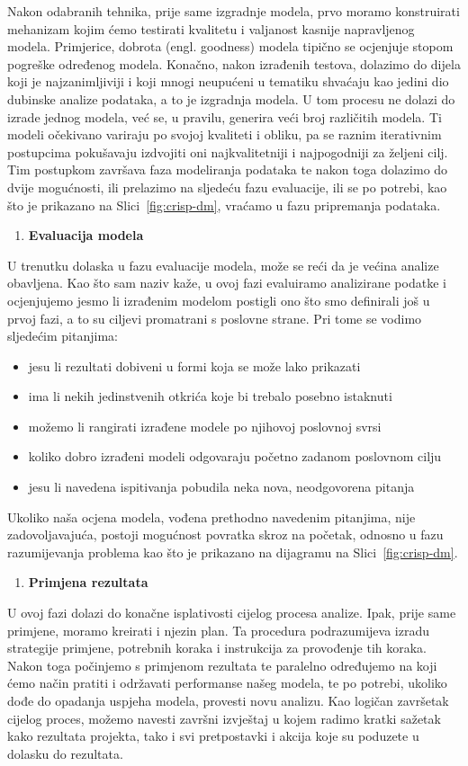 \documentclass[times, utf8, zavrsni, numeric]{fer}
\begin{document}
Nakon odabranih tehnika, prije same izgradnje modela, prvo moramo konstruirati mehanizam kojim ćemo testirati kvalitetu i valjanost kasnije napravljenog modela. Primjerice, dobrota (engl. goodness) modela tipično se ocjenjuje stopom pogreške određenog modela. Konačno, nakon izrađenih testova, dolazimo do dijela koji je najzanimljiviji i koji mnogi neupućeni u tematiku shvaćaju kao jedini dio dubinske analize podataka, a to je izgradnja modela. U tom procesu ne dolazi do izrade jednog modela, već se, u pravilu, generira veći broj različitih modela. Ti modeli očekivano variraju po svojoj kvaliteti i obliku, pa se raznim iterativnim postupcima pokušavaju izdvojiti oni najkvalitetniji i najpogodniji za željeni cilj. Tim postupkom završava faza modeliranja podataka te nakon toga dolazimo do dvije mogućnosti, ili prelazimo na sljedeću fazu evaluacije, ili se po potrebi, kao što je prikazano na Slici~\ref{fig:crisp-dm}, vraćamo u fazu pripremanja podataka.\cite{crisp2}\cite{crisp3}
\begin{enumerate}[resume]
\item \textbf{Evaluacija modela}
\end{enumerate}
U trenutku dolaska u fazu evaluacije modela, može se reći da je većina analize obavljena. Kao što sam naziv kaže, u ovoj fazi evaluiramo analizirane podatke i ocjenjujemo jesmo li izrađenim modelom postigli ono što smo definirali još u prvoj fazi, a to su ciljevi promatrani s poslovne strane. Pri tome se vodimo sljedećim pitanjima:
\begin{itemize}
\item jesu li rezultati dobiveni u formi koja se može lako prikazati
\item ima li nekih jedinstvenih otkrića koje bi trebalo posebno istaknuti
\item možemo li rangirati izrađene modele po njihovoj poslovnoj svrsi
\item koliko dobro izrađeni modeli odgovaraju početno zadanom poslovnom cilju
\item jesu li navedena ispitivanja pobudila neka nova, neodgovorena pitanja
\end{itemize}
Ukoliko naša ocjena modela, vođena prethodno navedenim pitanjima, nije zadovoljavajuća, postoji mogućnost povratka skroz na početak, odnosno u fazu razumijevanja problema kao što je prikazano na dijagramu na Slici~\ref{fig:crisp-dm}.\cite{crisp2}
\begin{enumerate}[resume]
\item \textbf{Primjena rezultata}
\end{enumerate}
U ovoj fazi dolazi do konačne isplativosti cijelog procesa analize. Ipak, prije same primjene, moramo kreirati i njezin plan. Ta procedura podrazumijeva izradu strategije primjene, potrebnih koraka i instrukcija za provođenje tih koraka. Nakon toga počinjemo s primjenom rezultata te paralelno određujemo na koji ćemo način pratiti i održavati performanse našeg modela, te po potrebi, ukoliko dođe do opadanja uspjeha modela, provesti novu analizu. Kao logičan završetak cijelog proces, možemo navesti završni izvještaj u kojem radimo kratki sažetak kako rezultata projekta, tako i svi pretpostavki i akcija koje su poduzete u dolasku do rezultata.
\end{document}
